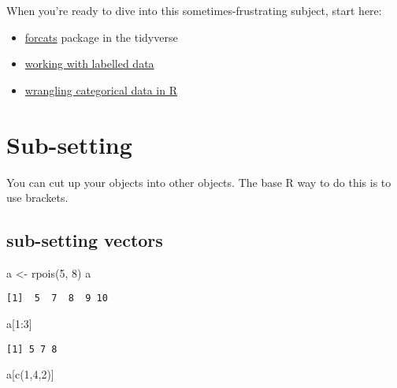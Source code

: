 \documentclass[
  letterpaper,
  DIV=11,
  numbers=noendperiod]{scrreprt}
\newenvironment{Shaded}{\begin{snugshade}}{\end{snugshade}}
\newcommand{\DecValTok}[1]{\textcolor[rgb]{0.68,0.00,0.00}{#1}}
\newcommand{\FunctionTok}[1]{\textcolor[rgb]{0.28,0.35,0.67}{#1}}
\newcommand{\NormalTok}[1]{\textcolor[rgb]{0.00,0.23,0.31}{#1}}
\newcommand{\OtherTok}[1]{\textcolor[rgb]{0.00,0.23,0.31}{#1}}
\newcommand{\SpecialCharTok}[1]{\textcolor[rgb]{0.37,0.37,0.37}{#1}}
\providecommand{\tightlist}{%
  \setlength{\itemsep}{0pt}\setlength{\parskip}{0pt}}\usepackage{longtable,booktabs,array}
\begin{document}
When you're ready to dive into this sometimes-frustrating subject, start
here:

\begin{itemize}
\tightlist
\item
  \href{https://forcats.tidyverse.org/}{forcats} package in the
  tidyverse
\item
  \href{https://cran.r-project.org/web/packages/sjlabelled/vignettes/labelleddata.html}{working
  with labelled data}
\item
  \href{https://peerj.com/preprints/3163/}{wrangling categorical data in
  R}
\end{itemize}

\section{Sub-setting}\label{sub-setting}

You can cut up your objects into other objects. The base R way to do
this is to use brackets.

\subsection{sub-setting vectors}\label{sub-setting-vectors}

\begin{Shaded}
\begin{Highlighting}[]
\NormalTok{a }\OtherTok{\textless{}{-}} \FunctionTok{rpois}\NormalTok{(}\DecValTok{5}\NormalTok{, }\DecValTok{8}\NormalTok{)}
\NormalTok{a}
\end{Highlighting}
\end{Shaded}

\begin{verbatim}
[1]  5  7  8  9 10
\end{verbatim}

\begin{Shaded}
\begin{Highlighting}[]
\NormalTok{a[}\DecValTok{1}\SpecialCharTok{:}\DecValTok{3}\NormalTok{]}
\end{Highlighting}
\end{Shaded}

\begin{verbatim}
[1] 5 7 8
\end{verbatim}

\begin{Shaded}
\begin{Highlighting}[]
\NormalTok{a[}\FunctionTok{c}\NormalTok{(}\DecValTok{1}\NormalTok{,}\DecValTok{4}\NormalTok{,}\DecValTok{2}\NormalTok{)]}
\end{Highlighting}
\end{Shaded}
\end{document}
